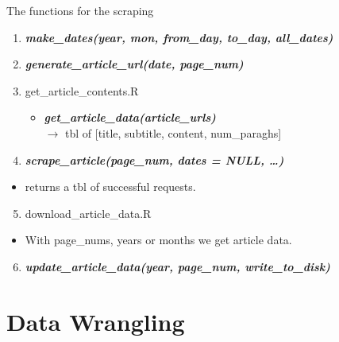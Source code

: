 \documentclass[
  10pt,
  ignorenonframetext,
]{beamer}
\providecommand{\tightlist}{%
  \setlength{\itemsep}{0pt}\setlength{\parskip}{0pt}}
\begin{document}
\begin{frame}{The functions for the scraping}
\protect\hypertarget{the-functions-for-the-scraping}{}
\begin{enumerate}
\tightlist
\item
  \emph{\textbf{make\_dates(year, mon, from\_day, to\_day, all\_dates)}}
\item
  \emph{\textbf{generate\_article\_url(date, page\_num)}}
\item
  get\_article\_contents.R

  \begin{itemize}
  \tightlist
  \item
    \emph{\textbf{get\_article\_data(article\_urls)}}\\
    \(\rightarrow{}\) tbl of {[}title, subtitle, content,
    num\_paraghs{]}
  \end{itemize}
\item
  \emph{\textbf{scrape\_article(page\_num, dates = NULL, \ldots)}}
\end{enumerate}

\begin{itemize}
\tightlist
\item
  returns a tbl of successful requests.
\end{itemize}

\begin{enumerate}
\setcounter{enumi}{4}
\tightlist
\item
  download\_article\_data.R
\end{enumerate}

\begin{itemize}
\tightlist
\item
  With page\_nums, years or months we get article data.\\
\end{itemize}

\begin{enumerate}
\setcounter{enumi}{5}
\tightlist
\item
  \emph{\textbf{update\_article\_data(year, page\_num,
  write\_to\_disk)}}
\end{enumerate}
\end{frame}

\hypertarget{data-wrangling}{%
\section{Data Wrangling}\label{data-wrangling}}
\end{document}
